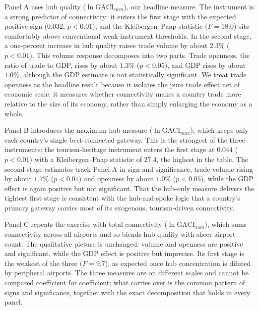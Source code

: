 Panel A uses hub quality ($\ln\mathrm{GACI}_{cwm}$), our headline measure. The
instrument is a strong predictor of connectivity: it enters the first stage with
the expected positive sign ($0.032$, $p<0.01$), and the Kleibergen--Paap
statistic ($F=18.0$) sits comfortably above conventional weak-instrument
thresholds. In the second stage, a one-percent increase in hub quality raises
trade volume by about $2.3\%$ ($p<0.01$). This volume response decomposes into two
parts. Trade openness, the ratio of trade to GDP, rises by about $1.3\%$
($p<0.05$), and GDP rises by about $1.0\%$, although the GDP estimate is not
statistically significant. We treat trade openness as the headline result because
it isolates the pure trade effect net of economic scale: it measures whether
connectivity makes a country trade more relative to the size of its economy,
rather than simply enlarging the economy as a whole.

Panel B introduces the maximum hub measure ($\ln\mathrm{GACI}_{max}$), which keeps
only each country's single best-connected gateway. This is the strongest of the
three instruments: the tourism-heritage instrument enters the first stage at
$0.044$ ($p<0.01$) with a Kleibergen--Paap statistic of $27.4$, the highest in the
table. The second-stage estimates track Panel A in sign and significance, trade
volume rising by about $1.7\%$ ($p<0.01$) and openness by about $1.0\%$
($p<0.05$), while the GDP effect is again positive but not significant. That the
hub-only measure delivers the tightest first stage is consistent with the
hub-and-spoke logic that a country's primary gateway carries most of its
exogenous, tourism-driven connectivity.

Panel C repeats the exercise with total connectivity ($\ln\mathrm{GACI}_{sum}$),
which sums connectivity across all airports and so blends hub quality with sheer
airport count. The qualitative picture is unchanged: volume and openness are
positive and significant, while the GDP effect is positive but imprecise. Its
first stage is the weakest of the three ($F=9.7$), as expected once hub
concentration is diluted by peripheral airports. The three measures are on
different scales and cannot be compared coefficient for coefficient; what carries
over is the common pattern of signs and significance, together with the exact
decomposition that holds in every panel.

